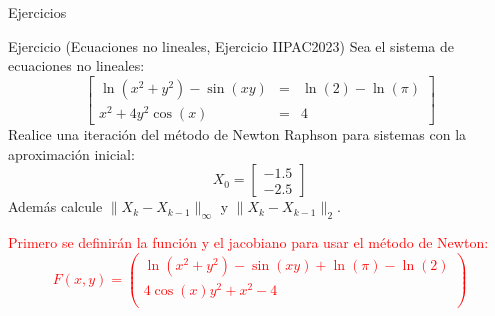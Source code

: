 \begin{frame}[fragile]{Ejercicios}
\label{EjercicioNewtonSistemas}
\begin{block}{Ejercicio (Ecuaciones no lineales, Ejercicio IIPAC2023)}
Sea el sistema de ecuaciones no lineales:
\begin{displaymath}
\begin{bmatrix}
\ln(x^2+y^2)-\sin(xy) &=& \ln(2)-\ln(\pi)\\
x^2+4y^2\cos(x) &=&4
\end{bmatrix}
\end{displaymath}
Realice una iteración del método de Newton Raphson para sistemas con la aproximación inicial:
\begin{displaymath}
X_0=\begin{bmatrix}
-1.5\\
-2.5
\end{bmatrix}
\end{displaymath}
Además calcule $\parallel X_k-X_{k-1}\parallel_{\infty}$ y $\parallel X_k-X_{k-1}\parallel_2$.
\end{block}\pause
\textcolor{red}{
Primero se definirán la función y el jacobiano para usar el método de Newton:
\small
\begin{displaymath}
F(x,y)=\begin{pmatrix}
\ln(x^2+y^2)-\sin(xy)+\ln(\pi)-\ln(2)\\
4\cos(x)y^2+x^2-4\\
\end{pmatrix}
\end{displaymath}
}
\end{frame}
